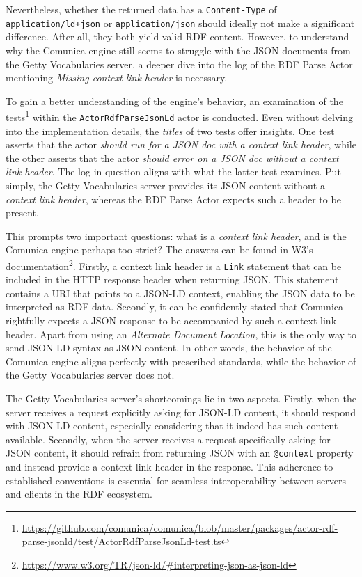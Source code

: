 Nevertheless, whether the returned data has a \texttt{Content-Type} of \texttt{application/ld+json} or \texttt{application/json} should ideally not make a significant difference. After all, they both yield valid RDF content. However, to understand why the Comunica engine still seems to struggle with the JSON documents from the Getty Vocabularies server, a deeper dive into the log of the RDF Parse Actor mentioning \textit{Missing context link header} is necessary.

To gain a better understanding of the engine's behavior, an examination of the tests\footnote{\url{https://github.com/comunica/comunica/blob/master/packages/actor-rdf-parse-jsonld/test/ActorRdfParseJsonLd-test.ts}} within the \texttt{ActorRdfParseJsonLd} actor is conducted. Even without delving into the implementation details, the \textit{titles} of two tests offer insights. One test asserts that the actor \textit{should run for a JSON doc with a context link header}, while the other asserts that the actor \textit{should error on a JSON doc without a context link header}. The log in question aligns with what the latter test examines. Put simply, the Getty Vocabularies server provides its JSON content without a \textit{context link header}, whereas the RDF Parse Actor expects such a header to be present. \citep{taelman2018comunica}

This prompts two important questions: what is a \textit{context link header}, and is the Comunica engine perhaps too strict? The answers can be found in W3's documentation\footnote{\url{https://www.w3.org/TR/json-ld/\#interpreting-json-as-json-ld}}. Firstly, a context link header is a \texttt{Link} statement that can be included in the HTTP response header when returning JSON. This statement contains a URI that points to a JSON-LD context, enabling the JSON data to be interpreted as RDF data. Secondly, it can be confidently stated that Comunica rightfully expects a JSON response to be accompanied by such a context link header. Apart from using an \textit{Alternate Document Location}, this is the only way to send JSON-LD syntax as JSON content. In other words, the behavior of the Comunica engine aligns perfectly with prescribed standards, while the behavior of the Getty Vocabularies server does not. \citep{kellogg2020jsonld}

The Getty Vocabularies server's shortcomings lie in two aspects. Firstly, when the server receives a request explicitly asking for JSON-LD content, it should respond with JSON-LD content, especially considering that it indeed has such content available. Secondly, when the server receives a request specifically asking for JSON content, it should refrain from returning JSON with an \texttt{@context} property and instead provide a context link header in the response. This adherence to established conventions is essential for seamless interoperability between servers and clients in the RDF ecosystem.

